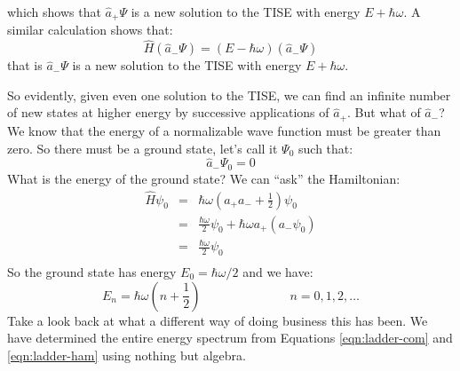 \documentclass[12pt]{book}
\begin{document}
which shows that $\hat{a}_+ \Psi$ is a new solution to the TISE with energy $E+\hbar\omega$.  A similar calculation shows that:
$$\hat{H} \left(\hat{a}_-\Psi\right) = \left( E - \hbar \omega \right) \left(\hat{a}_-\Psi\right)$$
that is $\hat{a}_- \Psi$ is a new solution to the TISE with energy $E+\hbar\omega$.

So evidently, given even one solution to the TISE, we can find an infinite number of new states at higher energy by successive applications of $\hat{a}_+$.  But what of $\hat{a}_-$?  We know that the energy of a normalizable wave function must be greater than zero.  So there must be a ground state, let's call it $\Psi_0$ such that:
\begin{equation}
\hat{a}_- \Psi_0 = 0
\end{equation}
What is the energy of the ground state?  We can ``ask'' the Hamiltonian:
\begin{eqnarray*}
\hat{H} \psi_0 &=& \hbar\omega \left( a_+ a_- + \frac{1}{2} \right) \psi_0 \\
&=& \frac{\hbar\omega}{2}\psi_0 + \hbar\omega a_+ \left( a_- \psi_0 \right)\\
&=& \frac{\hbar\omega}{2}\psi_0\\
\end{eqnarray*}
So the ground state has energy $E_0 = \hbar\omega/2$ and we have:
\begin{equation}
E_n = \hbar \omega \left(n + \frac{1}{2} \right) \hspace{3cm} n = 0,1,2,\ldots
\end{equation}
Take a look back at what a different way of doing business this has been.  We have determined the entire energy spectrum from Equations \ref{eqn:ladder-com} and \ref{eqn:ladder-ham} using nothing but  algebra.
\end{document}
